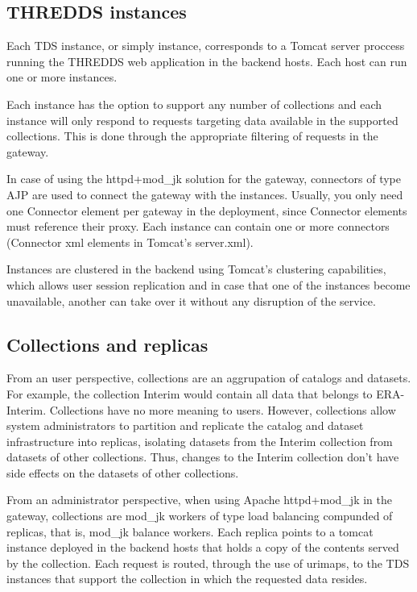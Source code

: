 \documentclass[a4paper,12pt]{article}
\begin{document}
\subsection{THREDDS instances}

Each TDS instance, or simply instance, corresponds to a Tomcat server proccess running the THREDDS web application in the backend hosts. Each host can run one or more instances. 

Each instance has the option to support any number of collections and each instance will only respond to requests targeting data available in the supported collections. This is done through the appropriate filtering of requests in the gateway.

In case of using the httpd+mod\_jk solution for the gateway, connectors of type AJP are used to connect the gateway with the instances. Usually, you only need one Connector element per gateway in the deployment, since Connector elements must reference their proxy.  Each instance can contain one or more connectors (Connector xml elements in Tomcat's server.xml).

Instances are clustered in the backend using Tomcat's clustering capabilities, which allows user session replication and in case that one of the instances become unavailable, another can take over it without any disruption of the service.

\subsection{Collections and replicas}

From an user perspective, collections are an aggrupation of catalogs and datasets. For example, the collection Interim would contain all data that belongs to ERA-Interim. Collections have no more meaning to users. However, collections allow system administrators to partition and replicate the catalog and dataset infrastructure into replicas, isolating datasets from the Interim collection from datasets of other collections. Thus, changes to the Interim collection don't have side effects on the datasets of other collections. 

From an administrator perspective, when using Apache httpd+mod\_jk in the gateway, collections are mod\_jk workers of type load balancing compunded of replicas, that is, mod\_jk balance workers. Each replica points to a tomcat instance deployed in the backend hosts that holds a copy of the contents served by the collection. Each request is routed, through the use of urimaps, to the TDS instances that support the collection in which the requested data resides.
\end{document}

